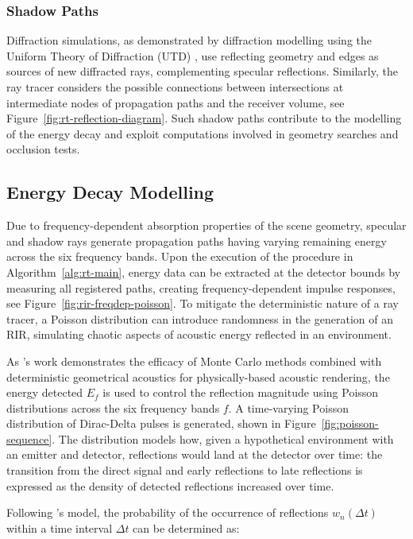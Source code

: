 \subsubsection{Shadow Paths}
Diffraction simulations, as demonstrated by diffraction modelling using the Uniform Theory of Diffraction (UTD) \cite{tsingos2001modeling}, use reflecting geometry and edges as sources of new diffracted rays, complementing specular reflections. Similarly, the ray tracer considers the possible connections between intersections at intermediate nodes of propagation paths and the receiver volume, see Figure~\ref{fig:rt-reflection-diagram}. Such shadow paths contribute to the modelling of the energy decay and exploit computations involved in geometry searches and occlusion tests. \par

\subsection{Energy Decay Modelling}
Due to frequency-dependent absorption properties of the scene geometry, specular and shadow rays generate propagation paths having varying remaining energy across the six frequency bands. Upon the execution of the procedure in Algorithm~\ref{alg:rt-main}, energy data can be extracted at the detector bounds by measuring all registered paths, creating frequency-dependent impulse responses, see Figure~\ref{fig:rir-freqdep-poisson}. To mitigate the deterministic nature of a ray tracer, a Poisson distribution can introduce randomness in the generation of an RIR, simulating chaotic aspects of acoustic energy reflected in an environment. \par
As \cite{schroder2011physically}'s work demonstrates the efficacy of Monte Carlo methods combined with deterministic geometrical acoustics for physically-based acoustic rendering, the energy detected $E_f$ is used to control the reflection magnitude using Poisson distributions across the six frequency bands $f$. A time-varying Poisson distribution of Dirac-Delta pulses is generated, shown in Figure~\ref{fig:poisson-sequence}. The distribution models how, given a hypothetical environment with an emitter and detector, reflections would land at the detector over time: the transition from the direct signal and early reflections to late reflections is expressed as the density of detected reflections increased over time. \par
Following \cite{schroder2011physically}'s model, the probability of the occurrence of reflections $w_n(\Delta t)$ within a time interval $\Delta t$ can be determined as:
